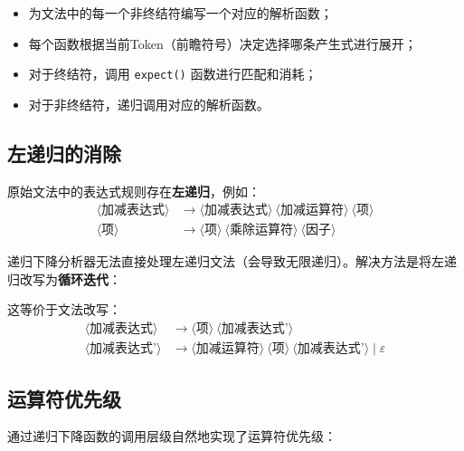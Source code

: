 \documentclass[12pt,a4paper]{ctexart}
\begin{document}
\begin{itemize}
    \item 为文法中的每一个非终结符编写一个对应的解析函数；
    \item 每个函数根据当前Token（前瞻符号）决定选择哪条产生式进行展开；
    \item 对于终结符，调用 \texttt{expect()} 函数进行匹配和消耗；
    \item 对于非终结符，递归调用对应的解析函数。
\end{itemize}

\subsection{左递归的消除}

原始文法中的表达式规则存在\textbf{左递归}，例如：
\begin{align}
    \langle\text{加减表达式}\rangle &\to \langle\text{加减表达式}\rangle\ \langle\text{加减运算符}\rangle\ \langle\text{项}\rangle \\
    \langle\text{项}\rangle &\to \langle\text{项}\rangle\ \langle\text{乘除运算符}\rangle\ \langle\text{因子}\rangle
\end{align}

递归下降分析器无法直接处理左递归文法（会导致无限递归）。解决方法是将左递归改写为\textbf{循环迭代}：



这等价于文法改写：
\begin{align}
    \langle\text{加减表达式}\rangle &\to \langle\text{项}\rangle\ \langle\text{加减表达式'}\rangle \\
    \langle\text{加减表达式'}\rangle &\to \langle\text{加减运算符}\rangle\ \langle\text{项}\rangle\ \langle\text{加减表达式'}\rangle \mid \varepsilon
\end{align}

\subsection{运算符优先级}

通过递归下降函数的调用层级自然地实现了运算符优先级：
\end{document}
